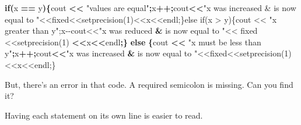 \documentclass[
]{book}
\newenvironment{Shaded}{\begin{snugshade}}{\end{snugshade}}
\newcommand{\ControlFlowTok}[1]{\textcolor[rgb]{0.13,0.29,0.53}{\textbf{#1}}}
\newcommand{\NormalTok}[1]{#1}
\newcommand{\OperatorTok}[1]{\textcolor[rgb]{0.81,0.36,0.00}{\textbf{#1}}}
\newcommand{\StringTok}[1]{\textcolor[rgb]{0.31,0.60,0.02}{#1}}
\begin{document}
\begin{Shaded}
\begin{Highlighting}[]
\ControlFlowTok{if}\OperatorTok{(}\NormalTok{x }\OperatorTok{==}\NormalTok{ y}\OperatorTok{)\{}\NormalTok{cout }\OperatorTok{\textless{}\textless{}} \StringTok{"values are equal"}\OperatorTok{;}\NormalTok{x}\OperatorTok{++;}\NormalTok{cout}\OperatorTok{\textless{}\textless{}}\StringTok{"x was increased \& is now }
\NormalTok{equal to }\StringTok{"\textless{}\textless{}fixed\textless{}\textless{}setprecision(1)\textless{}\textless{}x\textless{}\textless{}endl;\}else if(x \textgreater{} y)\{cout \textless{}\textless{} "}\NormalTok{x greater }
\NormalTok{than y}\StringTok{";x{-}{-}cout\textless{}\textless{}"}\NormalTok{x was reduced }\OperatorTok{\&}\NormalTok{ is now equal to }\StringTok{"\textless{}\textless{} fixed \textless{}\textless{}setprecision(1)}
\OperatorTok{\textless{}\textless{}}\NormalTok{x}\OperatorTok{\textless{}\textless{}}\NormalTok{endl}\OperatorTok{;\}} \ControlFlowTok{else} \OperatorTok{\{}\NormalTok{cout }\OperatorTok{\textless{}\textless{}} \StringTok{"x must be less than y"}\OperatorTok{;}\NormalTok{x}\OperatorTok{++;}\NormalTok{cout}\OperatorTok{\textless{}\textless{}}\StringTok{"x was increased }
\OperatorTok{\&}\NormalTok{ is now equal to }\StringTok{"\textless{}\textless{}fixed\textless{}\textless{}setprecision(1)\textless{}\textless{}x\textless{}\textless{}endl;\}}
\end{Highlighting}
\end{Shaded}

But, there's an error in that code. A required semicolon is missing.
Can you find it?

Having each statement on its own line is easier to read.
\end{document}
